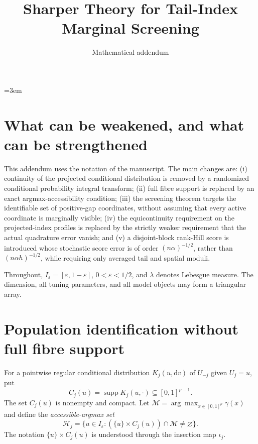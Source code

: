 \documentclass[11pt]{article}
\title{Sharper Theory for Tail-Index Marginal Screening}
\author{Mathematical addendum}
\date{}
\theoremstyle{definition}\newtheorem{definition}[theorem]{Definition}
\newcommand{\I}{I_\varepsilon}
\newcommand{\supp}{\operatorname{supp}}
\begin{document}
\emergencystretch=3em
\maketitle

\section{What can be weakened, and what can be strengthened}

This addendum uses the notation of the manuscript.  The main changes are:
(i) continuity of the projected conditional distribution is removed by a
randomized conditional probability integral transform; (ii) full fibre
support is replaced by an exact argmax-accessibility condition; (iii) the
screening theorem targets the identifiable set of positive-gap coordinates,
without assuming that every active coordinate is marginally visible; (iv)
the equicontinuity requirement on the projected-index profiles is replaced by
the strictly weaker requirement that the actual quadrature error vanish; and
(v) a disjoint-block rank-Hill score is introduced whose stochastic score
error is of order $(n\alpha)^{-1/2}$, rather than $(n\alpha h)^{-1/2}$, while
requiring only averaged tail and spatial moduli.

Throughout, $\I=[\varepsilon,1-\varepsilon]$, $0<\varepsilon<1/2$, and
$\lambda$ denotes Lebesgue measure.  The dimension, all tuning parameters,
and all model objects may form a triangular array.

\section{Population identification without full fibre support}

For a pointwise regular conditional distribution $K_j(u,\mathrm dv)$ of
$U_{-j}$ given $U_j=u$, put
\[
 C_j(u)=\supp K_j(u,\cdot)\subseteq[0,1]^{p-1}.
\]
The set $C_j(u)$ is nonempty and compact.  Let
$\mathcal M=\arg\max_{x\in[0,1]^p}\gamma(x)$ and define the
\emph{accessible-argmax set}
\[
 \mathcal H_j
 =\bigl\{u\in\I:(\{u\}\times C_j(u))\cap\mathcal M\ne\varnothing\bigr\}.
\]
The notation $\{u\}\times C_j(u)$ is understood through the insertion map
$\iota_j$.
\end{document}
